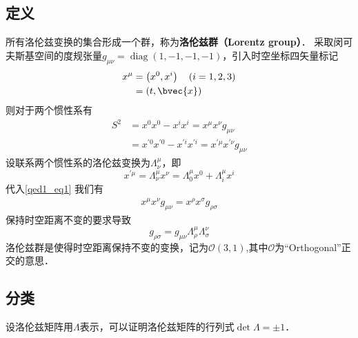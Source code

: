 

\subsection{定义}
所有洛伦兹变换的集合形成一个群，称为\textbf{洛伦兹群（Lorentz group）}．
采取闵可夫斯基空间的度规张量$g_{\mu \nu}=\operatorname{diag}(1,-1,-1,-1)$，引入时空坐标四矢量标记
\begin{equation}
\begin{aligned}
x^{\mu} &=\left(x^{0}, x^{i}\right) \quad(i=1,2,3)\\
&=(t, \bvec{x})
\end{aligned}
\end{equation}
则对于两个惯性系有
\begin{equation}\label{qed1_eq1}\begin{aligned}
S^{2} &=x^{0} x^{0}-x^{i} x^{i}=x^{\mu} x^{\nu} g_{\mu \nu} \\
&=x^{\prime 0} x^{\prime 0}-x^{\prime i} x^{\prime i}=x^{\prime \mu} x^{\prime \nu} g_{\mu \nu}
\end{aligned}\end{equation}
设联系两个惯性系的洛伦兹变换为$\Lambda_{\nu}^{\mu}$，即
\begin{equation}\label{qed1_eq2}x^{\prime \mu}=\Lambda_{\nu}^{\mu} x^{\nu}=\Lambda_{0}^{\mu} x^{0}+\Lambda_{i}^{\mu} x^{i}\end{equation}
代入\autoref{qed1_eq1} 我们有
\begin{align}
x^{\mu} x^{\nu} g_{\mu \nu}=x^{\rho} x^{\sigma} g_{\rho \sigma}
\end{align}
保持时空距离不变的要求导致
\begin{equation}\label{qed1_eq3}g_{\rho \sigma}=g_{\mu \nu} \Lambda_{\rho}^{\mu} \Lambda_{\sigma}^{\nu}\end{equation}
洛伦兹群是使得时空距离保持不变的变换，记为$\mathcal{O}(3,1)$,其中$\mathcal{O}$为“Orthogonal”正交的意思．
\subsection{分类}
设洛伦兹矩阵用$\Lambda$表示，可以证明洛伦兹矩阵的行列式$\det \Lambda=\pm1$．

